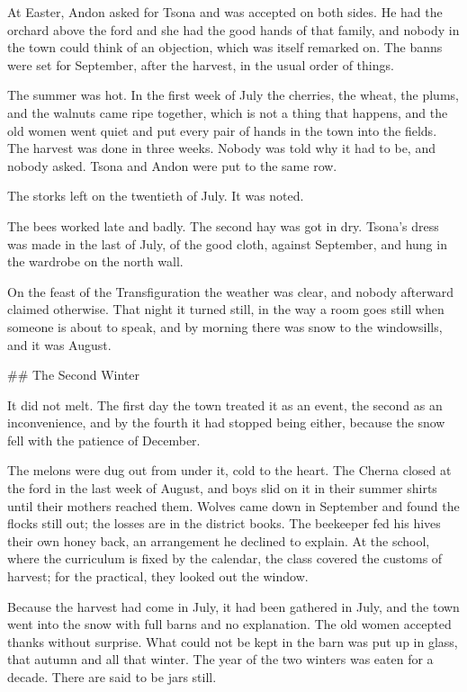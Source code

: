 \documentclass[11pt]{article}
\begin{document}
At Easter, Andon asked for Tsona and was accepted on both sides. He had the orchard above the ford and she had the good hands of that family, and nobody in the town could think of an objection, which was itself remarked on. The banns were set for September, after the harvest, in the usual order of things.

The summer was hot. In the first week of July the cherries, the wheat, the plums, and the walnuts came ripe together, which is not a thing that happens, and the old women went quiet and put every pair of hands in the town into the fields. The harvest was done in three weeks. Nobody was told why it had to be, and nobody asked. Tsona and Andon were put to the same row.

The storks left on the twentieth of July. It was noted.

The bees worked late and badly. The second hay was got in dry. Tsona's dress was made in the last of July, of the good cloth, against September, and hung in the wardrobe on the north wall.

On the feast of the Transfiguration the weather was clear, and nobody afterward claimed otherwise. That night it turned still, in the way a room goes still when someone is about to speak, and by morning there was snow to the windowsills, and it was August.

\#\# The Second Winter

It did not melt. The first day the town treated it as an event, the second as an inconvenience, and by the fourth it had stopped being either, because the snow fell with the patience of December.

The melons were dug out from under it, cold to the heart. The Cherna closed at the ford in the last week of August, and boys slid on it in their summer shirts until their mothers reached them. Wolves came down in September and found the flocks still out; the losses are in the district books. The beekeeper fed his hives their own honey back, an arrangement he declined to explain. At the school, where the curriculum is fixed by the calendar, the class covered the customs of harvest; for the practical, they looked out the window.

Because the harvest had come in July, it had been gathered in July, and the town went into the snow with full barns and no explanation. The old women accepted thanks without surprise. What could not be kept in the barn was put up in glass, that autumn and all that winter. The year of the two winters was eaten for a decade. There are said to be jars still.
\end{document}
